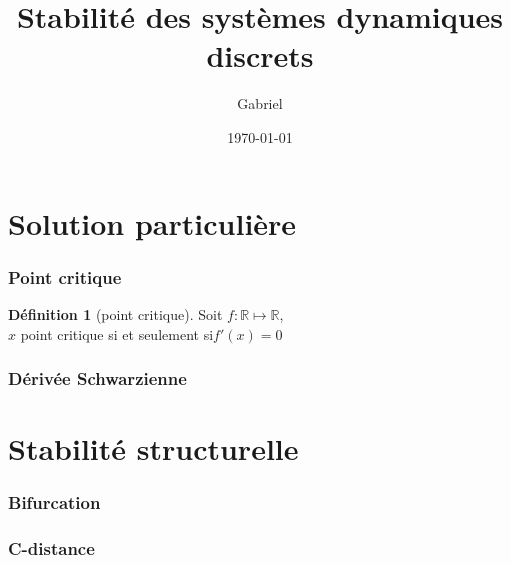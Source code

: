 \documentclass{article}
\title{Stabilité des systèmes dynamiques discrets}
\author{Gabriel \bsc{Hondet}}
\date{\today}
\newcommand\ssi{si et seulement si\xspace}
\theoremstyle{definition}
\newtheorem{defn}{Définition}
\theoremstyle{plain}
\theoremstyle{remark}
\begin{document}
\maketitle
\tableofcontents

\part{Solution particulière}
\section{Point critique}
\begin{defn}[point critique]
    Soit $f:\mathbb{R}\mapsto \mathbb{R}$,\\
    $x$ point critique \ssi $f'(x) = 0$
\end{defn}
\section{Dérivée Schwarzienne}

\part{Stabilité structurelle}
\section{Bifurcation}
\section{C-distance}
\end{document}
